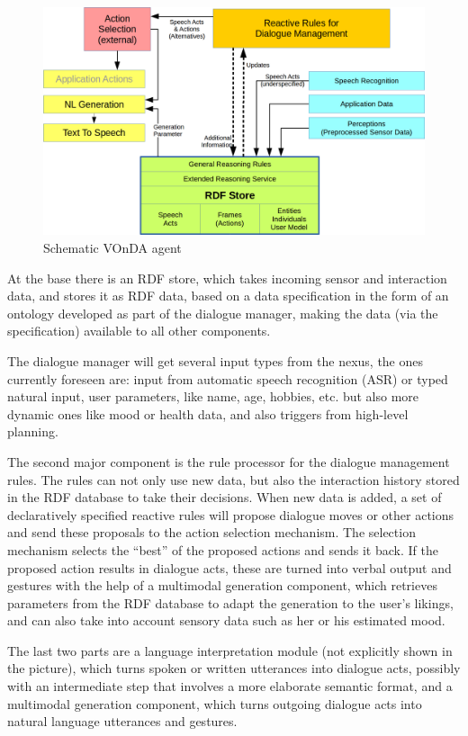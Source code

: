 \documentclass[a4paper]{report}
\newcommand{\vonda}{VOnDA\xspace}
\begin{document}
\begin{figure}[htb]
\includegraphics[width=.9\textwidth]{rudimant.png}
\caption{\label{fig:arch}Schematic \vonda agent}
\end{figure}

At the base there is an RDF store, which takes incoming sensor and interaction
data, and stores it as RDF data, based on a data specification in the form of
an ontology developed as part of the dialogue manager, making the data (via the
specification) available to all other components.

The dialogue manager will get several input types from the nexus, the ones
currently foreseen are: input from automatic speech recognition (ASR) or typed
natural input, user parameters, like name, age, hobbies, etc. but also more
dynamic ones like mood or health data, and also triggers from high-level
planning.

The second major component is the rule processor for the dialogue management
rules. The rules can not only use new data, but also the interaction history
stored in the RDF database to take their decisions.  When new data is added, a
set of declaratively specified reactive rules will propose dialogue moves or
other actions and send these proposals to the action selection mechanism. The
selection mechanism selects the ``best'' of the proposed actions and sends it
back. If the proposed action results in dialogue acts, these are turned into
verbal output and gestures with the help of a multimodal generation component,
which retrieves parameters from the RDF database to adapt the generation to the
user's likings, and can also take into account sensory data such as her or his
estimated mood.

The last two parts are a language interpretation module (not
explicitly shown in the picture), which turns spoken or written utterances
into dialogue acts, possibly with an intermediate step that involves a more
elaborate semantic format, and a multimodal generation component, which turns
outgoing dialogue acts into natural language utterances and gestures.
\end{document}
